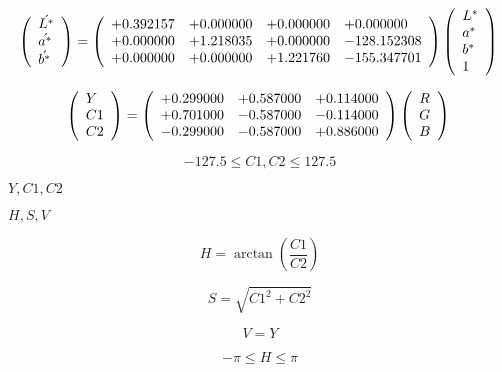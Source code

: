 \documentclass{article}
\begin{document}
\[ \left( \begin{array}{l} \acute{L^{*}} \\ \acute{a^{*}} \\ \acute{b^{*}} \\ \end{array} \right) = \left( \begin{array}{llll} +0.392157 & +0.000000 & +0.000000 & +0.000000 \\ +0.000000 & +1.218035 & +0.000000 & -128.152308 \\ +0.000000 & +0.000000 & +1.221760 & -155.347701 \\ \end{array} \right) \left( \begin{array}{l} L^{*} \\ a^{*} \\ b^{*} \\ 1 \\ \end{array} \right) \\ \]
\pagebreak

\[ \left( \begin{array}{l} Y \\ C1 \\ C2 \\ \end{array} \right) = \left( \begin{array}{lll} +0.299000 & +0.587000 & +0.114000 \\ +0.701000 & -0.587000 & -0.114000 \\ -0.299000 & -0.587000 & +0.886000 \\ \end{array} \right) \left( \begin{array}{l} R \\ G \\ B \\ \end{array} \right)\\ \]
\pagebreak

\[ -127.5 \le C1, C2 \le 127.5 \]
\pagebreak

$ Y,C1,C2 $
\pagebreak

$ H,S,V $
\pagebreak

\[ H=\arctan \left(\frac{C1}{C2}\right) \]
\pagebreak

\[ S=\sqrt{C1^{2}+C2^{2}} \]
\pagebreak

\[ V=Y \]
\pagebreak

\[ -\pi \le H \le \pi \]
\pagebreak
\end{document}
